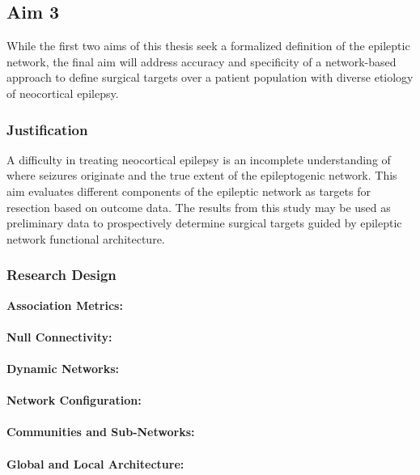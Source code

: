 \subsection{Aim 3}
While the first two aims of this thesis seek a formalized definition of the epileptic network, the final aim will address accuracy and specificity of a network-based approach to define surgical targets over a patient population with diverse etiology of neocortical epilepsy.

\subsubsection{Justification}
A difficulty in treating neocortical epilepsy is an incomplete understanding of where seizures originate and the true extent of the epileptogenic network. This aim evaluates different components of the epileptic network as targets for resection based on outcome data. The results from this study may be used as preliminary data to prospectively determine surgical targets guided by epileptic network functional architecture.

\subsubsection{Research Design}
\textbf{Association Metrics:}
~\\
~\\
\textbf{Null Connectivity:}
~\\
~\\
\textbf{Dynamic Networks:}
~\\
~\\
\textbf{Network Configuration:}
~\\
~\\
\textbf{Communities and Sub-Networks:}
~\\
~\\
\textbf{Global and Local Architecture:}



